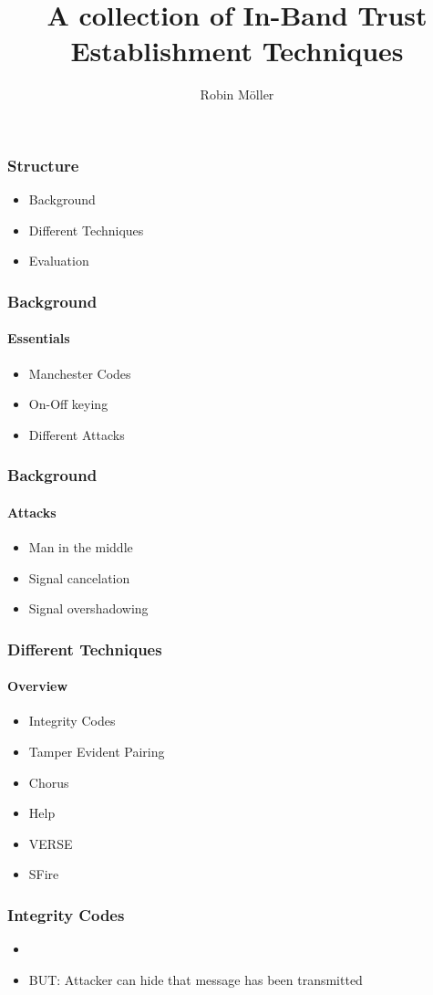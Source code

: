 \documentclass{beamer}
\title{A collection of In-Band Trust Establishment Techniques}
\author{Robin Möller}
\institute[]{Technical University Munich}
\begin{document}
\begin{frame}
\titlepage
\end{frame}

\begin{frame}
\frametitle{Structure}
\begin{itemize}
	\item Background
	\item Different Techniques
	\item Evaluation
\end{itemize}
\end{frame}

\begin{frame}
	\frametitle{Background}
	\framesubtitle{Essentials}
	\begin{itemize}
		\item Manchester Codes
		\item On-Off keying
		\item Different Attacks
	\end{itemize}
\end{frame}

\begin{frame}
	\frametitle{Background}
	\framesubtitle{Attacks}
	\begin{itemize}
		\item Man in the middle
		\item Signal cancelation
		\item Signal overshadowing
	\end{itemize}
\end{frame}

\begin{frame}
	\frametitle{Different Techniques}
	\framesubtitle{Overview}
	\begin{itemize}
		\item Integrity Codes
		\item Tamper Evident Pairing
		\item Chorus
		\item Help
		\item VERSE
		\item SFire
	\end{itemize}
\end{frame}

\begin{frame}
	\frametitle{Integrity Codes}
	\begin{itemize}
		\item 
		\item BUT: Attacker can hide that message has been transmitted
	\end{itemize}
\end{frame}
\end{document}
